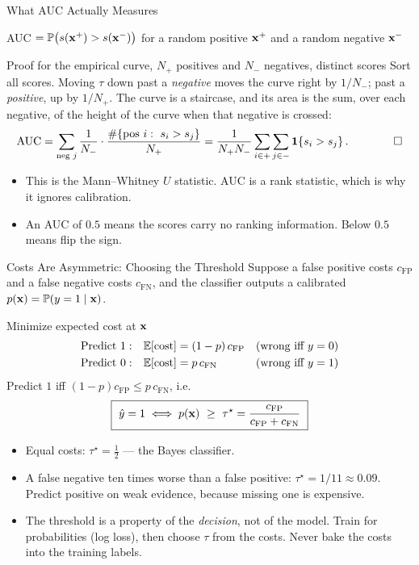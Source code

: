 \documentclass[11pt,aspectratio=169]{beamer}
\begin{document}
\begin{frame}{What AUC Actually Measures}
\begin{claim}{AUC $=\mathbb{P}\bigl(s(\mathbf{x}^+)>s(\mathbf{x}^-)\bigr)$ for a random positive $\mathbf{x}^+$ and a random negative $\mathbf{x}^-$}
\end{claim}
\begin{derivation}{Proof for the empirical curve, $N_+$ positives and $N_-$ negatives, distinct scores}
Sort all scores. Moving $\tau$ down past a \emph{negative} moves the curve right by $1/N_-$; past a
\emph{positive}, up by $1/N_+$. The curve is a staircase, and its area is the sum, over each negative, of the
height of the curve when that negative is crossed:
\[
\text{AUC}=\sum_{\text{neg }j}\frac1{N_-}\cdot\frac{\#\{\text{pos }i:\ s_i>s_j\}}{N_+}
=\frac{1}{N_+N_-}\sum_{i\in+}\sum_{j\in-}\mathbf{1}\!\left\{s_i>s_j\right\}.\qquad\qed
\]
\end{derivation}
\begin{itemize}
  \item This is the Mann--Whitney $U$ statistic. AUC is a rank statistic, which is why it ignores calibration.
  \item An AUC of $0.5$ means the scores carry no ranking information. Below $0.5$ means flip the sign.
\end{itemize}
\end{frame}

\begin{frame}{Costs Are Asymmetric: Choosing the Threshold}\footnotesize
Suppose a false positive costs $c_{\text{FP}}$ and a false negative costs $c_{\text{FN}}$, and the classifier
outputs a calibrated $p(\mathbf{x})=\mathbb{P}(y=1\mid\mathbf{x})$.
\begin{derivation}{Minimize expected cost at $\mathbf{x}$}
\begin{align*}
\text{Predict }1:&\quad\mathbb{E}[\text{cost}]=(1-p)\,c_{\text{FP}} && \text{(wrong iff }y=0\text{)}\\
\text{Predict }0:&\quad\mathbb{E}[\text{cost}]=p\,c_{\text{FN}} && \text{(wrong iff }y=1\text{)}
\end{align*}
Predict $1$ iff $(1-p)c_{\text{FP}}\le p\,c_{\text{FN}}$, i.e.
\[
\boxed{\ \hat y=1\iff p(\vx)\ \ge\ \tau^\star=\frac{c_{\text{FP}}}{c_{\text{FP}}+c_{\text{FN}}}\ }
\]
\end{derivation}
\begin{itemize}
  \item Equal costs: $\tau^\star=\tfrac12$ --- the Bayes classifier.
  \item A false negative ten times worse than a false positive: $\tau^\star=1/11\approx0.09$. Predict positive
        on weak evidence, because missing one is expensive.
  \item The threshold is a property of the \emph{decision}, not of the model. Train for probabilities (log loss),
        then choose $\tau$ from the costs. Never bake the costs into the training labels.
\end{itemize}
\end{frame}
\end{document}
